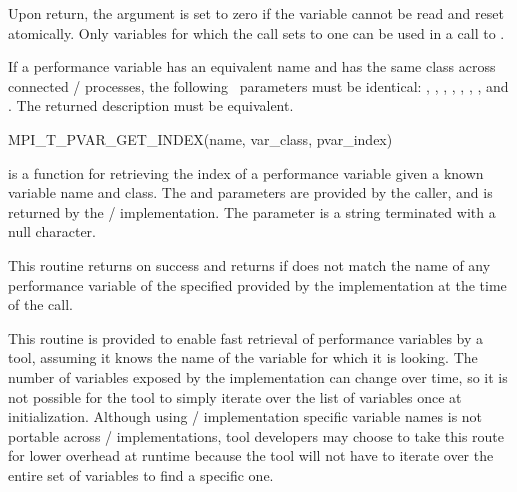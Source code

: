 Upon return, the argument  is set to zero if the variable
cannot be read and reset atomically.  Only variables for which the call
sets  to one can be used in a call to
.

If a performance variable has an equivalent name and has the same class
across connected \MPI/ processes, the following \OUT\  parameters must be
identical: , , ,
, , , ,
and .  The returned description must be equivalent.

\begin{funcdef}{MPI\_T\_PVAR\_GET\_INDEX}{(\mbox{name}, \mbox{var\_class}, \mbox{pvar\_index})}
\end{funcdef}

 is a function for retrieving the index
of a performance variable given a known variable name and class.  The
 and  parameters are provided by the
caller, and  is returned by the \MPI/ implementation.
The  parameter is a string terminated with a null character.

This routine returns  on success and returns
 if  does not match the name
of any performance variable of the specified  provided
by the implementation at the time of the call.

\begin{rationale}
This routine is provided to enable fast retrieval of performance variables
by a tool, assuming it knows the name of the variable for which it is
looking.  The number of variables exposed by the implementation can change
over time, so it is not possible for the tool to simply iterate over the
list of variables once at initialization.  Although using \MPI/
implementation specific variable names is not portable across \MPI/
implementations, tool developers may choose to take this route for lower
overhead at runtime because the tool will not have to iterate over the
entire set of variables to find a specific one.
\end{rationale}

